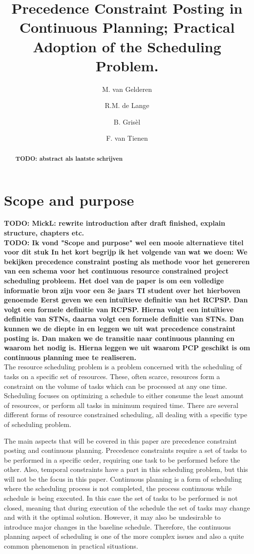 \documentclass{article}
\title{Precedence Constraint Posting in Continuous Planning; Practical Adoption of the Scheduling Problem.}
\author{M. van Gelderen  \and
    R.M. de Lange \and
    B. Gris\`el \and
    F. van Tienen}
\date{}
\newcommand{\TODO}[1]{{\color{red}\textbf{TODO: #1}}}
\begin{document}
\maketitle
\thispagestyle{empty}

\begin{abstract}
\TODO{abstract als laatste schrijven}
\end{abstract}

\newpage

\section{Scope and purpose}
\TODO{MickL: rewrite introduction after draft finished, explain structure, chapters etc.}\\

\TODO{Ik vond "Scope and purpose" wel een mooie alternatieve titel voor dit stuk
In het kort begrijp ik het volgende van wat we doen: 
We bekijken precedence constraint posting als methode voor het genereren van een schema voor het continuous resource constrained project scheduling probleem. Het doel van de paper is om een volledige informatie bron zijn voor een 3e jaars TI student over het hierboven genoemde
Eerst geven we een intuïtieve definitie van het RCPSP. Dan volgt een formele definitie van RCPSP. Hierna volgt een intuïtieve definitie van STNs, daarna volgt een formele definitie van STNs. 
Dan kunnen we de diepte in en leggen we uit wat precedence constraint posting is. Dan maken we de transitie naar continuous planning en waarom het nodig is. Hierna leggen we uit waarom PCP geschikt is om continuous planning mee te realiseren.} \\

The resource scheduling problem is a problem concerned with the scheduling of tasks on a specific set of resources.
These, often scarce, resources form a constraint on the volume of tasks which can be processed at any one time.
Scheduling focuses on optimizing a schedule to either consume the least amount of resources, or perform all tasks in minimum required time.  \cite{brucker99}
There are several different forms of resource constrained scheduling, all dealing with a specific type of scheduling problem.

The main aspects that will be covered in this paper are precedence constraint posting and continuous planning.
Precedence constraints require a set of tasks to be performed in a specific order, requiring one task to be performed before the other.
Also, temporal constraints have a part in this scheduling problem, but this will not be the focus in this paper.
Continuous planning is a form of scheduling where the scheduling process is not completed, the process continuous while schedule is being executed.
In this case the set of tasks to be performed is not closed, meaning that during execution of the schedule the set of tasks may change and with it the optimal solution.
However, it may also be undesirable to introduce major changes in the baseline schedule.
Therefore, the continuous planning aspect of scheduling is one of the more complex issues and also a quite common phenomenon in practical situations.
\end{document}
